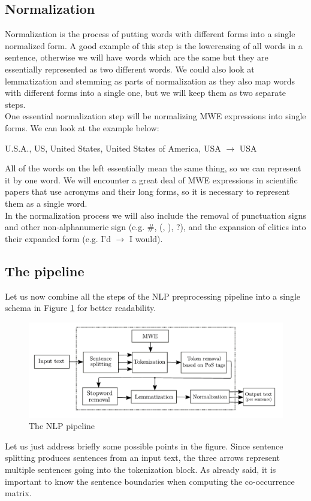 \documentclass[12pt]{article}
\numberwithin{equation}{section}
\begin{document}
\begin{spacing}{1.5}
	\subsection{Normalization}
	Normalization is the process of putting words with different forms into a single normalized form. A good example of this step is the lowercasing of all words in a sentence, otherwise we will have words which are the same but they are essentially represented as two different words. We could also look at lemmatization and stemming as parts of normalization as they also map words with different forms into a single one, but we will keep them as two separate steps. \\
	One essential normalization step will be normalizing MWE expressions into single forms. We can look at the example below:
	\begin{center}
		U.S.A., US, United States, United States of America, USA $\rightarrow$ USA
	\end{center}
	All of the words on the left essentially mean the same thing, so we can represent it by one word. We will encounter a great deal of MWE expressions in scientific papers that use acronyms and their long forms, so it is necessary to represent them as a single word. \\ 
	In the normalization process we will also include the removal of punctuation signs and other non-alphanumeric sign (e.g. \#, (, ), ?), and the expansion of clitics into their expanded form (e.g. I'd $\rightarrow$ I would).
	
	\subsection{The pipeline}
	Let us now combine all the steps of the NLP preprocessing pipeline into a single schema in Figure \ref{NLP_pipeline_label} for better readability.
	\begin{figure}[H]
		\centering
		\hspace*{-1.0cm}
		\includegraphics[scale=0.85]{NLP_pipeline}		
		\caption{The NLP pipeline}
		\label{NLP_pipeline_label}
	\end{figure}
	Let us just address briefly some possible points in the figure. Since sentence splitting produces sentences from an input text, the three arrows represent multiple sentences going into the tokenization block. As already said, it is important to know the sentence boundaries when computing the co-occurrence matrix.
	

\end{spacing}
\end{document}

